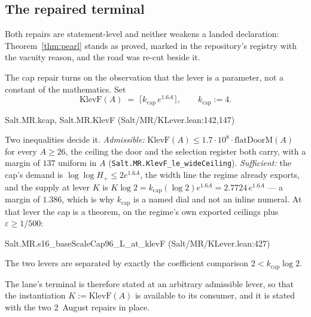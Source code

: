 \documentclass[11pt]{amsart}
\newcommand{\leanname}[1]{\par{\noindent\small\ttfamily\raggedright #1\par}}
\newcommand{\leaninline}[1]{{\small\texttt{#1}}}
\theoremstyle{remark}
\begin{document}
\subsection{The repaired terminal}\label{sec:pearl-repair}
Both repairs are statement-level and neither weakens a landed declaration:
Theorem~\ref{thm:pearl} stands as proved, marked in the repository's registry
with the vacuity reason, and the road was re-cut beside it.

The cap repair turns on the observation that the lever is a parameter, not a
constant of the mathematics. Set
\[
\mathrm{KlevF}(A) \;=\; \bigl\lceil k_{\mathrm{cap}}\, e^{1.6A}\bigr\rceil,
\qquad k_{\mathrm{cap}} := 4 .
\]
\leanname{Salt.MR.kcap, Salt.MR.KlevF (Salt/MR/KLever.lean:142,147)}
\noindent Two inequalities decide it. \emph{Admissible:}
$\mathrm{KlevF}(A) \le 1.7\cdot10^{8}\cdot\mathrm{flatDoorM}(A)$ for every
$A \ge 26$, the ceiling the door and the selection register both carry, with a
margin of $137$ uniform in $A$
(\leaninline{Salt.MR.KlevF\_le\_wideCeiling}). \emph{Sufficient:} the cap's
demand is $\log\log H_+ \le 2e^{1.6A}$, the width line the regime already
exports, and the supply at lever $K$ is $K\log 2 = k_{\mathrm{cap}}(\log 2)
e^{1.6A} = 2.7724\,e^{1.6A}$ --- a margin of $1.386$, which is why
$k_{\mathrm{cap}}$ is a named dial and not an inline numeral. At that lever the
cap is a theorem, on the regime's own exported ceilings plus
$\varepsilon \ge 1/500$:
\leanname{Salt.MR.s16\_baseScaleCap96\_L\_at\_klevF (Salt/MR/KLever.lean:427)}
The two levers are separated by exactly the coefficient comparison
$2 < k_{\mathrm{cap}}\log 2$.

The lane's terminal is therefore stated at an arbitrary admissible lever, so
that the instantiation $K := \mathrm{KlevF}(A)$ is available to its consumer,
and it is stated with the two 2~August repairs in place.
\end{document}
